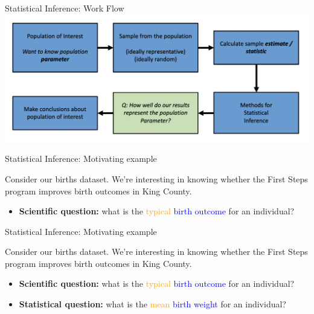 \documentclass[10pt,t]{beamer}
\begin{document}
\begin{frame}[c]{Statistical Inference: Work Flow}
\centering \includegraphics[scale=0.4]{statinference_workflow.png}
\end{frame}

\begin{frame}{Statistical Inference: Motivating example}

Consider our births dataset. We're interesting in knowing whether the First Steps program improves birth outcomes in King County.

\vspace{0.1cm}

\begin{itemize}
	\item \textbf{Scientific question:} what is the \textcolor{orange}{typical}  \textcolor{blue}{birth outcome} for an individual?

\end{itemize}

\end{frame}

\begin{frame}{Statistical Inference: Motivating example}

Consider our births dataset. We're interesting in knowing whether the First Steps program improves birth outcomes in King County.

\vspace{0.1cm}

\begin{itemize}
	\item \textbf{Scientific question:} what is the \textcolor{orange}{typical}  \textcolor{blue}{birth outcome} for an individual?
	\item \textbf{Statistical question:} what is the \textcolor{orange}{mean} \textcolor{blue}{birth weight} for an individual?
\end{itemize}

\end{frame}
\end{document}
